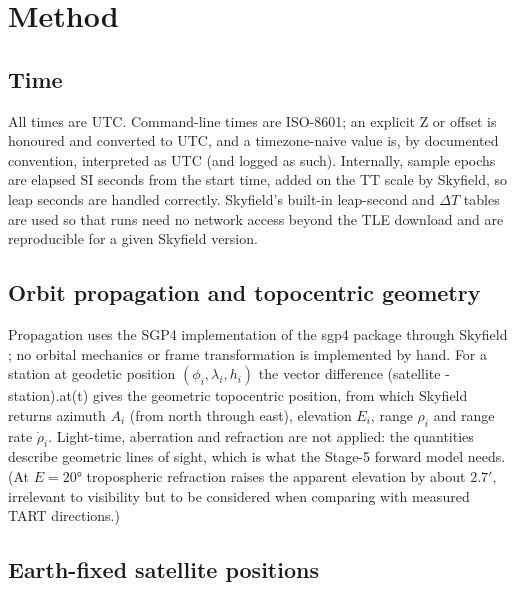 \documentclass[11pt,a4paper]{article}
\newcommand{\code}[1]{{\ttfamily\def\_{\textunderscore\allowbreak}#1}}
\begin{document}
\section{Method}

\subsection{Time}

All times are UTC. Command-line times are ISO-8601; an explicit \code{Z} or
offset is honoured and converted to UTC, and a timezone-naive value is, by
documented convention, interpreted as UTC (and logged as such). Internally,
sample epochs are elapsed SI seconds from the start time, added on the TT
scale by Skyfield, so leap seconds are handled correctly. Skyfield's
built-in leap-second and $\Delta T$ tables are used so that runs need no
network access beyond the TLE download and are reproducible for a given
Skyfield version.

\subsection{Orbit propagation and topocentric geometry}

Propagation uses the SGP4 implementation of the \code{sgp4} package through
Skyfield \cite{skyfield,sgp4,vallado2006}; no orbital mechanics or frame
transformation is implemented by hand. For a station at geodetic position
$(\phi_i,\lambda_i,h_i)$ the vector difference
\code{(satellite - station).at(t)} gives the geometric topocentric position,
from which Skyfield returns azimuth $A_i$ (from north through east),
elevation $E_i$, range $\rho_i$ and range rate $\dot\rho_i$. Light-time,
aberration and refraction are not applied: the quantities describe geometric
lines of sight, which is what the Stage-5 forward model needs. (At
$E=\ang{20}$ tropospheric refraction raises the apparent elevation by about
$\ang{;2.7;}$, irrelevant to visibility but to be considered when comparing with
measured TART directions.)

\subsection{Earth-fixed satellite positions}
\end{document}
